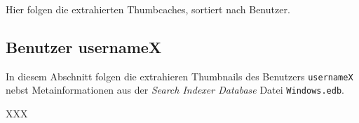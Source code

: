 
Hier folgen die extrahierten Thumbcaches, sortiert nach Benutzer.

\subsection{Benutzer usernameX}

In diesem Abschnitt folgen die extrahieren Thumbnails des Benutzers \texttt{usernameX} nebst Metainformationen aus der \emph{Search Indexer Database} Datei \texttt{Windows.edb}.

XXX

